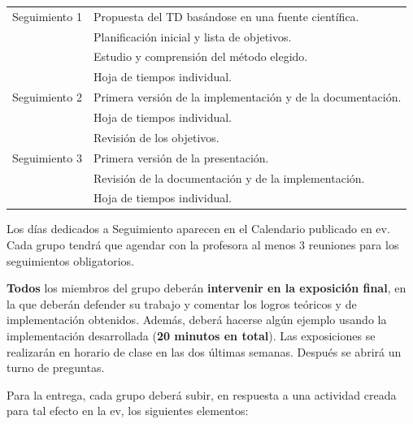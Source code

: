 \documentclass[a4paper]{article}
\begin{document}
    \begin{center}
    \begin{tabular}{|c||l|}
    \hline
  Seguimiento 1 & Propuesta del TD basándose en una fuente científica.   \\& Planificación inicial y lista de objetivos. \\
  & Estudio y comprensión del método elegido. \\
  & Hoja de tiempos individual.\\
\hline
Seguimiento 2  & Primera versión de la implementación y de la documentación. \\ &  Hoja de tiempos individual.\\& Revisión de los objetivos. \\
\hline
 Seguimiento 3  & Primera versión de la presentación.  \\& Revisión de la documentación  y de la  implementación.\\&  Hoja de tiempos individual.\\
\hline
    \end{tabular}
    \end{center}
Los días dedicados a Seguimiento aparecen en el Calendario publicado en ev. Cada grupo tendrá que agendar con la profesora al menos 3 reuniones para los seguimientos obligatorios.

\textbf{Todos} los miembros del grupo deberán \textbf{intervenir en la exposición final}, en la que deberán defender su trabajo y comentar los logros teóricos y de implementación obtenidos. Además, deberá hacerse algún ejemplo usando la implementación desarrollada (\textbf{20 minutos en total}). Las exposiciones se realizarán en horario de clase en las dos últimas semanas. Después se abrirá un turno de preguntas.



Para la entrega, cada grupo deberá subir, en respuesta a una actividad creada para tal efecto en la ev, los siguientes elementos:
\end{document}
